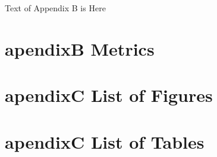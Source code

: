 \documentclass{article}
\begin{document}
Text of Appendix B is Here

\section{apendixB Metrics}
\section{apendixC List of Figures}
\listoffigures


\section{apendixC List of Tables}
\listoftables
\newpage


\end{document}
